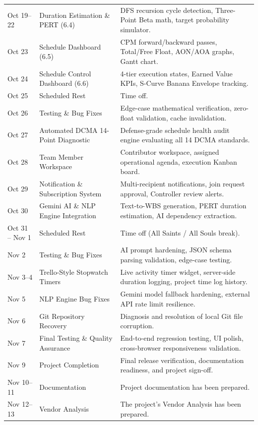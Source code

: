 \begin{table}[H]
\begin{tabularx}{\textwidth}{l p{3.7cm} X}
Oct 19--22 & Duration Estimation \& PERT (6.4) & DFS recursion cycle detection, Three-Point Beta math, target probability simulator. \\
Oct 23 & Schedule Dashboard (6.5) & CPM forward/backward passes, Total/Free Float, AON/AOA graphs, Gantt chart. \\
Oct 24 & Schedule Control Dashboard (6.6) & 4-tier execution states, Earned Value KPIs, S-Curve Banana Envelope tracking. \\
Oct 25 & Scheduled Rest & Time off. \\
Oct 26 & Testing \& Bug Fixes & Edge-case mathematical verification, zero-float validation, cache invalidation. \\
Oct 27 & Automated DCMA 14-Point Diagnostic & Defense-grade schedule health audit engine evaluating all 14 DCMA standards. \\
Oct 28 & Team Member Workspace & Contributor workspace, assigned operational agenda, execution Kanban board. \\
Oct 29 & Notification \& Subscription System & Multi-recipient notifications, join request approval, Controller review alerts. \\
Oct 30 & Gemini AI \& NLP Engine Integration & Text-to-WBS generation, PERT duration estimation, AI dependency extraction. \\
Oct 31 -- Nov 1 & Scheduled Rest & Time off (All Saints / All Souls break). \\
Nov 2 & Testing \& Bug Fixes & AI prompt hardening, JSON schema parsing validation, edge-case testing. \\
Nov 3--4 & Trello-Style Stopwatch Timers & Live activity timer widget, server-side duration logging, project time log history. \\
Nov 5 & NLP Engine Bug Fixes & Gemini model fallback hardening, external API rate limit resilience. \\
Nov 6 & Git Repository Recovery & Diagnosis and resolution of local Git file corruption. \\
Nov 7 & Final Testing \& Quality Assurance & End-to-end regression testing, UI polish, cross-browser responsiveness validation. \\
Nov 9 & Project Completion & Final release verification, documentation readiness, and project sign-off. \\
Nov 10--11 & Documentation & Project documentation has been prepared. \\
Nov 12--13 & Vendor Analysis & The project's Vendor Analysis has been prepared. \\
\bottomrule
\end{tabularx}
\end{table}
